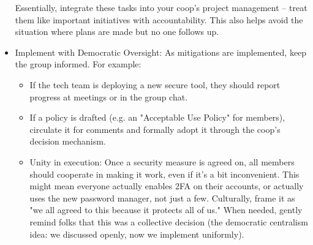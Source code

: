 \begin{itemize}
    Essentially, integrate these tasks into your coop's project management – treat them like important initiatives
    with accountability. This also helps avoid the situation where plans are made but no one follows up.
    
    \item Implement with Democratic Oversight: As mitigations are implemented, keep the group informed. For
    example:
        \begin{itemize}   
            \item If the tech team is deploying a new secure tool, they should report progress at meetings or in
    the group chat.
            \item If a policy is drafted (e.g. an "Acceptable Use Policy" for members), circulate it for comments and
    formally adopt it through the coop's decision mechanism.
            \item Unity in execution: Once a security measure is agreed on, all members should cooperate in making it
    work, even if it's a bit inconvenient. This might mean everyone actually enables 2FA on their accounts, or
    actually uses the new password manager, not just a few. Culturally, frame it as "we all agreed to this because
    it protects all of us." When needed, gently remind folks that this was a collective decision (the democratic
    centralism idea: we discussed openly, now we implement uniformly).
        \end{itemize}
    

\end{itemize}
